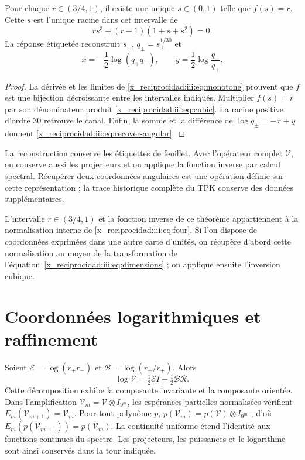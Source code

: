 \begin{theorem}
Pour chaque $r\in(3/4,1)$, il existe une unique $s\in(0,1)$ telle que $f(s)=r$.
Cette $s$ est l’unique racine dans cet intervalle de
\begin{equation}
 r s^3+(r-1)(1+s+s^2)=0.
 \label{x_reciprocidad:iii:eq:cubic}
\end{equation}
La réponse étiquetée reconstruit $s_\pm$, $q_\pm=s_\pm^{1/30}$ et
\begin{equation}
 x=-\frac12\log(q_+q_-),\qquad
 y=\frac12\log\frac{q_-}{q_+}.
 \label{x_reciprocidad:iii:eq:recover-angular}
\end{equation}
\end{theorem}
\begin{proof}
La dérivée et les limites de \eqref{x_reciprocidad:iii:eq:monotone} prouvent que $f$ est une
bijection décroissante entre les intervalles indiqués. Multiplier $f(s)=r$
par son dénominateur produit \eqref{x_reciprocidad:iii:eq:cubic}. La racine positive d’ordre
$30$ retrouve le canal. Enfin, la somme et la différence de
$\log q_\pm=-x\mp y$ donnent \eqref{x_reciprocidad:iii:eq:recover-angular}.
\end{proof}

La reconstruction conserve les étiquettes de feuillet. Avec l’opérateur complet
$\mathcal V$, on conserve aussi les projecteurs et on applique la fonction
inverse par calcul spectral. Récupérer deux coordonnées angulaires est une
opération définie sur cette représentation ; la trace historique complète
du TPK conserve des données supplémentaires.

L'intervalle $r\in(3/4,1)$ et la fonction inverse de ce théorème appartiennent à la normalisation interne de \eqref{x_reciprocidad:iii:eq:four}. Si l'on dispose de coordonnées exprimées dans une autre carte d'unités, on récupère d'abord cette normalisation au moyen de la transformation de l'équation~\eqref{x_reciprocidad:iii:eq:dimensions} ; on applique ensuite l'inversion cubique.

\section{Coordonnées logarithmiques et raffinement}

Soient $\mathcal E=\log(r_+r_-)$ et $\mathcal B=\log(r_-/r_+)$. Alors
\begin{equation}
 \log\mathcal V=\tfrac12\mathcal E I-\tfrac12\mathcal B\mathcal R.
 \label{x_reciprocidad:iii:eq:logvac}
\end{equation}
Cette décomposition exhibe la composante invariante et la composante orientée.
Dans l’amplification $\mathcal V_m=\mathcal V\otimes I_{9^m}$, les
espérances partielles normalisées vérifient
$E_m(\mathcal V_{m+1})=\mathcal V_m$. Pour tout polynôme $p$,
$p(\mathcal V_m)=p(\mathcal V)\otimes I_{9^m}$ ; d’où
$E_m(p(\mathcal V_{m+1}))=p(\mathcal V_m)$. La continuité uniforme
étend l’identité aux fonctions continues du spectre. Les projecteurs,
les puissances et le logarithme sont ainsi conservés dans la tour indiquée.

